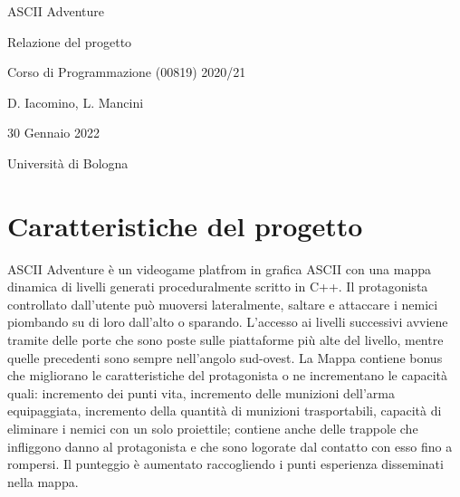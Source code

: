 \documentclass[12pt]{article}
\begin{document}
\begin{titlepage}
   \begin{center}
        \vspace*{5cm}

        \Huge{ASCII Adventure}

        \vspace{0.5cm}
        \LARGE{Relazione del progetto}
        
        \vspace{0.25cm}
        \large{Corso di Programmazione (00819) 2020/21}
       
        \vspace{0.25cm}
        \large{D. Iacomino, L. Mancini}
       
        \vspace{3 cm}
        \Large{30 Gennaio 2022}
        
        \vspace{0.25 cm}
        \Large{Università di Bologna}
       

       \vfill
    \end{center}
\end{titlepage}

\setcounter{page}{2}
\pagestyle{fancy}
\fancyhf{}
\rhead{\thepage}

\section*{Caratteristiche del progetto}

ASCII Adventure è un videogame platfrom in grafica ASCII con una mappa dinamica di livelli generati proceduralmente scritto in C++.
Il protagonista controllato dall'utente può muoversi lateralmente, saltare e attaccare i nemici piombando su di loro dall'alto o sparando.
L'accesso ai livelli successivi avviene tramite delle porte che sono poste sulle piattaforme più alte del livello, mentre quelle precedenti sono sempre nell'angolo sud-ovest.
La Mappa contiene bonus che migliorano le caratteristiche del protagonista o ne incrementano le capacità quali: incremento dei punti vita, incremento delle munizioni dell'arma equipaggiata, incremento della quantità di munizioni trasportabili, capacità di eliminare i nemici con un solo proiettile; contiene anche delle trappole che infliggono danno al protagonista e che sono logorate dal contatto con esso fino a rompersi.
Il punteggio è aumentato raccogliendo i punti esperienza disseminati nella mappa.
\end{document}
